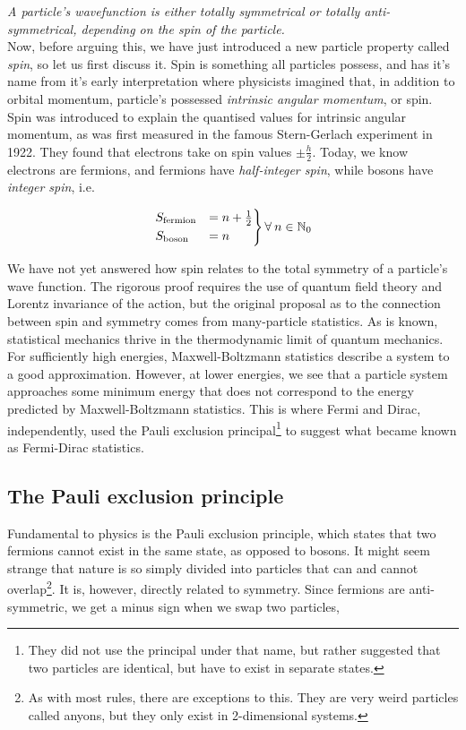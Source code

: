 \documentclass[10pt,twoside]{report}
\begin{document}
	\emph{A particle's wavefunction is either totally symmetrical or totally anti-symmetrical, depending on the spin of the particle.}\\
	
	Now, before arguing this, we have just introduced a new particle property called \emph{spin}, so let us first discuss it. Spin is something all particles possess, and has it's name from it's early interpretation where physicists imagined that, in addition to orbital momentum, particle's possessed \emph{intrinsic angular momentum}, or spin. Spin was introduced to explain the quantised values for intrinsic angular momentum, as was first measured in the famous Stern-Gerlach experiment in 1922. They found that electrons take on spin values $\pm\frac{h}{2}$. Today, we know electrons are fermions, and fermions have \emph{half-integer spin}, while bosons have \emph{integer spin}, i.e.
	
	\begin{equation}
		\begin{rcases}
		S_{\text{fermion}} &= n + \frac{1}{2}\\
		S_{\text{boson}} &= n
		\end{rcases} \forall\:n\in\mathbb{N}_0
	\end{equation}
	
	We have not yet answered how spin relates to the total symmetry of a particle's wave function. The rigorous proof requires the use of quantum field theory and Lorentz invariance of the action, but the original proposal as to the connection between spin and symmetry comes from many-particle statistics. As is known, statistical mechanics thrive in the thermodynamic limit of quantum mechanics. For sufficiently high energies, Maxwell-Boltzmann statistics describe a system to a good approximation. However, at lower energies, we see that a particle system approaches some minimum energy that does not correspond to the energy predicted by Maxwell-Boltzmann statistics. This is where Fermi and Dirac, independently, used the Pauli exclusion principal\footnote{They did not use the principal under that name, but rather suggested that two particles are identical, but have to exist in separate states.} to suggest what became known as Fermi-Dirac statistics.
	
	\subsection{The Pauli exclusion principle}
	Fundamental to physics is the Pauli exclusion principle, which states that two fermions cannot exist in the same state, as opposed to bosons. It might seem strange that nature is so simply divided into particles that can and cannot overlap\footnote{As with most rules, there are exceptions to this. They are very weird particles called anyons, but they only exist in 2-dimensional systems.}. It is, however, directly related to symmetry. Since fermions are anti-symmetric, we get a minus sign when we swap two particles,
	
\end{document}
